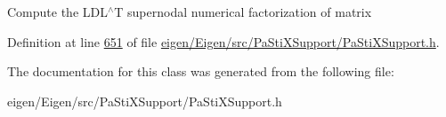 Compute the L\+D\+L$^\wedge$T supernodal numerical factorization of {\ttfamily matrix} 

Definition at line \hyperlink{eigen_2_eigen_2src_2_pa_sti_x_support_2_pa_sti_x_support_8h_source_l00651}{651} of file \hyperlink{eigen_2_eigen_2src_2_pa_sti_x_support_2_pa_sti_x_support_8h_source}{eigen/\+Eigen/src/\+Pa\+Sti\+X\+Support/\+Pa\+Sti\+X\+Support.\+h}.



The documentation for this class was generated from the following file\+:\begin{DoxyCompactItemize}
\item 
eigen/\+Eigen/src/\+Pa\+Sti\+X\+Support/\+Pa\+Sti\+X\+Support.\+h\end{DoxyCompactItemize}
